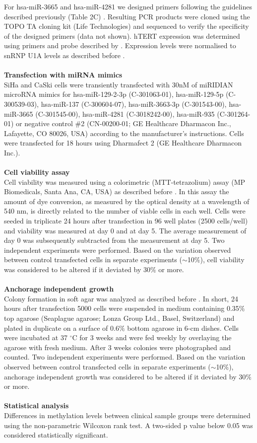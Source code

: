 For hsa-miR-3665 and hsa-miR-4281 we designed primers following the guidelines described previously (Table 2C) \cite{Chen2005}. Resulting PCR products were cloned using the TOPO TA cloning kit (Life Technologies) and sequenced to verify the specificity of the designed primers (data not shown). hTERT expression was determined using primers and probe described by \cite{Buttitta2003}. Expression levels were normalised to snRNP U1A levels as described before \cite{Henken2012}.
\\
\\
\textbf{Transfection with miRNA mimics}
\\
SiHa and CaSki cells were transiently transfected with 30nM of miRIDIAN microRNA mimics for  hsa-miR-129-2-3p (C-301063-01), hsa-miR-129-5p (C-300539-03), hsa-miR-137 (C-300604-07), hsa-miR-3663-3p (C-301543-00), hsa-miR-3665 (C-301545-00), hsa-miR-4281 (C-3018242-00), hsa-miR-935 (C-301264-01) or negative control $\#$2 (CN-00200-01; GE Healthcare Dharmacon Inc., Lafayette, CO 80026, USA) according to the manufacturer's instructions. Cells were transfected for 18 hours using Dharmafect 2 (GE Healthcare Dharmacon Inc.). 
\\
\\
\textbf{Cell viability assay}
\\
Cell viability was measured using a colorimetric (MTT-tetrazolium) assay (MP Biomedicals, Santa Ana, CA, USA) as described before \cite{Overmeer2009}. In this assay the amount of dye conversion, as measured by the optical density at a wavelength of 540 nm, is directly related to the number of viable cells in each well. Cells were seeded in triplicate 24 hours after transfection in 96 well plates (2500 cells/well) and viability was measured at day 0 and at day 5. The average measurement of day 0 was subsequently subtracted from the measurement at day 5. Two independent experiments were performed. Based on the variation observed between control transfected cells in separate experiments ($\sim$10$\%$), cell viability was considered to be altered if it deviated by 30$\%$ or more.
\\
\\
\textbf{Anchorage independent growth}
\\
Colony formation in soft agar was analyzed as described before \cite{Steenbergen2004}. In short, 24 hours after transfection 5000 cells were suspended in medium containing 0.35$\%$ top agarose (Seaplague agarose; Lonza Group Ltd., Basel, Switzerland) and plated in duplicate on a surface of 0.6$\%$ bottom agarose in 6-cm dishes. Cells were incubated at 37 $^{\circ}$C for 3 weeks and were fed weekly by overlaying the agarose with fresh medium. After 3 weeks colonies were photographed and counted. Two independent experiments were performed. Based on the variation observed between control transfected cells in separate experiments ($\sim$10$\%$), anchorage independent growth was considered to be altered if it deviated by 30$\%$ or more.
\\
\\
\textbf{Statistical analysis}
\\
Differences in methylation levels between clinical sample groups were determined using the non-parametric Wilcoxon rank test. A two-sided p value below 0.05 was considered statistically significant.